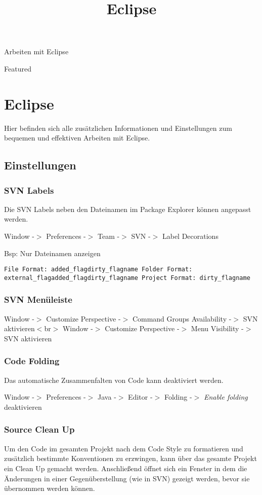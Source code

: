 \documentclass[a4paper,11pt]{article}
\title{Eclipse}
\begin{document}
Arbeiten mit Eclipse

Featured

\section{Eclipse}
Hier befinden sich alle zusätzlichen Informationen und Einstellungen zum bequemen und effektiven Arbeiten mit Eclipse.

\subsection{Einstellungen}

\subsubsection{SVN Labels}
Die SVN Labels neben den Dateinamen im Package Explorer können angepasst werden.

Window -$>$ Preferences -$>$ Team -$>$ SVN -$>$ Label Decorations

Bsp: Nur Dateinamen anzeigen 
\begin{verbatim}
File Format: added_flagdirty_flagname Folder Format: external_flagadded_flagdirty_flagname Project Format: dirty_flagname\end{verbatim}

\subsubsection{SVN Menüleiste}
Window -$>$ Customize Perspective -$>$ Command Groups Availability -$>$ SVN aktivieren$<$br$>$
Window -$>$ Customize Perspective -$>$ Menu Visibility -$>$ SVN aktivieren

\subsubsection{Code Folding}
Das automatische Zusammenfalten von Code kann deaktiviert werden.

Window -$>$ Preferences -$>$ Java -$>$ Editor -$>$ Folding -$>$ \textit{Enable folding} deaktivieren

\subsubsection{Source Clean Up}
Um den Code im gesamten Projekt nach dem Code Style zu formatieren und zusätzlich bestimmte Konventionen zu erzwingen, kann über das gesamte Projekt ein Clean Up gemacht werden. Anschließend öffnet sich ein Fenster in dem die Änderungen in einer Gegenüberstellung (wie in SVN) gezeigt werden, bevor sie übernommen werden können.
\end{document}
